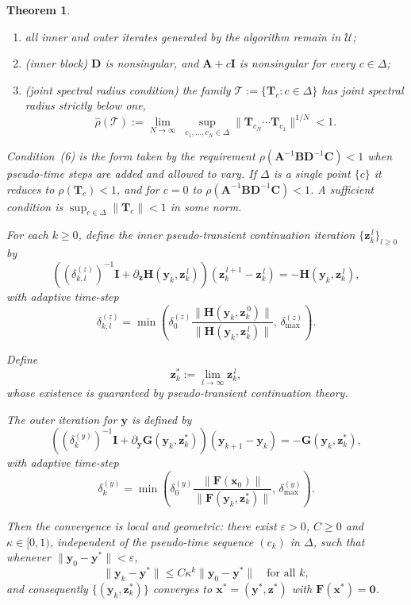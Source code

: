 \documentclass[11pt,a4paper]{article}
\newtheorem{theorem}{Theorem}
\begin{document}
\begin{theorem}
\begin{enumerate}
\item all inner and outer iterates generated by the algorithm remain in
$\mathcal U$;

\item (\emph{inner block}) $\mathbf D$ is nonsingular, and
$\mathbf A + c\mathbf I$ is nonsingular for every $c \in \Delta$;

\item (\emph{joint spectral radius condition}) the family
$\mathcal T := \{\mathbf T_c : c \in \Delta\}$ has joint spectral radius strictly below one,
\[
\hat\rho(\mathcal T)
:= \lim_{N\to\infty}\;\sup_{c_1,\dots,c_N\in\Delta}
\bigl\|\mathbf T_{c_N}\cdots\mathbf T_{c_1}\bigr\|^{1/N} < 1 .
\]
\end{enumerate}
Condition~(6) is the form taken by the requirement $\rho(\mathbf A^{-1}\mathbf B\mathbf D^{-1}\mathbf C)<1$
when pseudo-time steps are added and allowed to vary. If $\Delta$ is a single point $\{c\}$ it
reduces to $\rho(\mathbf T_c)<1$, and for $c = 0$ to $\rho(\mathbf A^{-1}\mathbf B\mathbf D^{-1}\mathbf C)<1$.
A sufficient condition is $\sup_{c\in\Delta}\|\mathbf T_c\| < 1$ in some norm.

For each $k \ge 0$, define the inner pseudo-transient continuation iteration
$\{\mathbf{z}_k^{\,l}\}_{l \ge 0}$ by
\[
\left(
(\delta_{k,l}^{(z)})^{-1} \mathbf I
+
\partial_{\mathbf z}\mathbf H(\mathbf y_k, \mathbf z_k^{\,l})
\right)
(\mathbf z_k^{\,l+1} - \mathbf z_k^{\,l})
=
-
\mathbf H(\mathbf y_k, \mathbf z_k^{\,l}),
\]
with adaptive time-step
\[
\delta_{k,l}^{(z)}
=
\min\!\left(
\delta_0^{(z)}
\frac{\|\mathbf H(\mathbf y_k, \mathbf z_k^{\,0})\|}
     {\|\mathbf H(\mathbf y_k, \mathbf z_k^{\,l})\|},
\,
\delta_{\max}^{(z)}
\right).
\]

Define
\[
\mathbf z_k^*
:=
\lim_{l\to\infty} \mathbf z_k^{\,l},
\]
whose existence is guaranteed by pseudo-transient continuation theory.

The outer iteration for $\mathbf y$ is defined by
\[
\left(
(\delta_k^{(y)})^{-1} \mathbf I
+
\partial_{\mathbf y}\mathbf G(\mathbf y_k, \mathbf z_k^*)
\right)
(\mathbf y_{k+1} - \mathbf y_k)
=
-
\mathbf G(\mathbf y_k, \mathbf z_k^*),
\]
with adaptive time-step
\[
\delta_k^{(y)}
=
\min\!\left(
\delta_0^{(y)}
\frac{\|\mathbf F(\mathbf x_0)\|}
     {\|\mathbf F(\mathbf y_k,\mathbf z_k^*)\|},
\,
\delta_{\max}^{(y)}
\right).
\]

Then the convergence is \emph{local and geometric}: there exist $\varepsilon>0$, $C\ge 0$ and
$\kappa\in[0,1)$, independent of the pseudo-time sequence $(c_k)$ in $\Delta$, such that whenever
$\|\mathbf y_0-\mathbf y^*\|<\varepsilon$,
\[
\|\mathbf y_k - \mathbf y^*\| \le C\kappa^k\|\mathbf y_0-\mathbf y^*\|
\quad\text{for all }k,
\]
and consequently $\{(\mathbf y_k,\mathbf z_k^*)\}$ converges to
$\mathbf x^* = (\mathbf y^*,\mathbf z^*)$ with $\mathbf F(\mathbf x^*) = \mathbf 0$.
\end{theorem}
\end{document}
